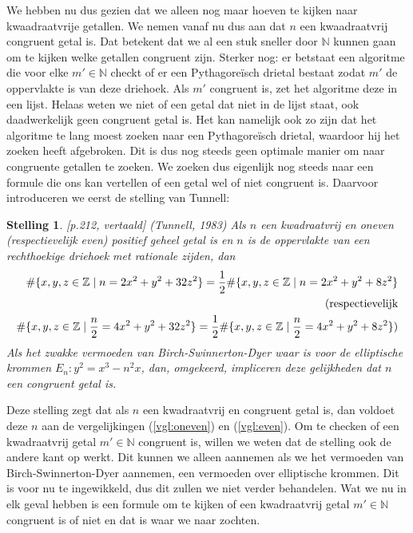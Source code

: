 \documentclass[12pt,reqno]{article}
\newcommand*{\NN}{\ensuremath{\mathbb{N}}}
\newcommand*{\ZZ}{\ensuremath{\mathbb{Z}}}
\theoremstyle{theorem}
\newtheorem{theorem}{Stelling}
\theoremstyle{definition}
\begin{document}
	We hebben nu dus gezien dat we alleen nog maar hoeven te kijken naar kwaadraatvrije getallen. We nemen vanaf nu dus aan dat $n$ een kwaadraatvrij congruent getal is. Dat betekent dat we al een stuk sneller door $\NN$ kunnen gaan om te kijken welke getallen congruent zijn. Sterker nog: er betstaat een algoritme die voor elke $m'\in\NN$ checkt of er een Pythagore\"isch drietal bestaat zodat $m'$ de oppervlakte is van deze driehoek. Als $m'$ congruent is, zet het algoritme deze in een lijst. Helaas weten we niet of een getal dat niet in de lijst staat, ook daadwerkelijk geen congruent getal is. Het kan namelijk ook zo zijn dat het algoritme te lang moest zoeken naar een Pythagore\"isch drietal, waardoor hij het zoeken heeft afgebroken. Dit is dus nog steeds geen optimale manier om naar congruente getallen te zoeken. We zoeken dus eigenlijk nog steeds naar een formule die ons kan vertellen of een getal wel of niet congruent is. Daarvoor introduceren we eerst de stelling van Tunnell:
	\begin{theorem}\label{def:tunnell}
		\cite{Koblitz}[p.212, vertaald] (Tunnell, 1983) Als $n$ een kwadraatvrij en oneven (respectievelijk even) positief geheel getal is en $n$ is de oppervlakte van een rechthoekige driehoek met rationale zijden, dan
		\begin{align}
		\label{vgl:oneven} \#\{x,y,z\in\ZZ \mid n=2x^2+y^2+32z^2\} = \frac{1}{2} \#\{x,y,z\in\ZZ \mid n=2x^2+y^2+8z^2\}\\
		\notag \text{(respectievelijk} \\
		\label{vgl:even} \#\{x,y,z\in\ZZ \mid \frac{n}{2}=4x^2+y^2+32z^2\} = \frac{1}{2} \#\{x,y,z\in\ZZ \mid \frac{n}{2}=4x^2+y^2+8z^2\})
		\end{align}
		Als het zwakke vermoeden van Birch-Swinnerton-Dyer waar is voor de elliptische krommen $E_n:y^2=x^3-n^2x$, dan, omgekeerd, impliceren deze gelijkheden dat $n$ een congruent getal is.
	\end{theorem}
	Deze stelling zegt dat als $n$ een kwadraatvrij en congruent getal is, dan voldoet deze $n$ aan de vergelijkingen (\ref{vgl:oneven}) en (\ref{vgl:even}). Om te checken of een kwadraatvrij getal $m'\in\NN$ congruent is, willen we weten dat de stelling ook de andere kant op werkt. Dit kunnen we alleen aannemen als we het vermoeden van Birch-Swinnerton-Dyer aannemen, een vermoeden over elliptische krommen. Dit is voor nu te ingewikkeld, dus dit zullen we niet verder behandelen. Wat we nu in elk geval hebben is een formule om te kijken of een kwadraatvrij getal $m'\in\NN$ congruent is of niet en dat is waar we naar zochten.
	
\end{document}
